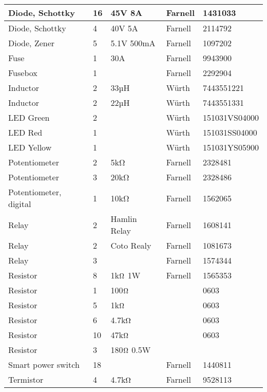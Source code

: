 \documentclass[10pt, titlepage]{article}
\begin{document}
\begin{center}
\begin{tabularx}{\textwidth}{|X|l|l|l|l|}
    Diode, Schottky & 16 & 45V 8A & Farnell & 1431033 \\ \hline
    Diode, Schottky & 4 & 40V 5A & Farnell & 2114792 \\ \hline
    Diode, Zener & 5 & 5.1V 500mA & Farnell & 1097202 \\ \hline
    Fuse & 1 & 30A & Farnell & 9943900\\ \hline
    Fusebox & 1 & & Farnell & 2292904 \\ \hline
    Inductor & 2 & 33µH & Würth & 7443551221 \\ \hline
    Inductor & 2 & 22µH & Würth & 7443551331 \\ \hline
    LED Green & 2 & & Würth & 151031VS04000 \\ \hline
    LED Red & 1 & & Würth & 151031SS04000 \\ \hline
    LED Yellow & 1 & & Würth & 151031YS05900 \\ \hline
    Potentiometer & 2 & 5kΩ  & Farnell & 2328481 \\ \hline
    Potentiometer & 3 & 20kΩ & Farnell & 2328486 \\ \hline
    Potentiometer, digital & 1 & 10kΩ & Farnell & 1562065 \\ \hline
    Relay & 2 & Hamlin Relay & Farnell & 1608141\\ \hline
    Relay & 2 & Coto Realy & Farnell & 1081673 \\ \hline
    Relay & 3 & & Farnell & 1574344 \\ \hline
    Resistor & 8 & 1k$\ohm$ 1W & Farnell & 1565353 \\ \hline
    Resistor & 1 & 100$\ohm$ & & 0603  \\ \hline
    Resistor & 5 & 1k$\ohm$ & & 0603  \\ \hline
    Resistor & 6 & 4.7k$\ohm$ & & 0603  \\ \hline
    Resistor & 10 & 47k$\ohm$ & & 0603  \\ \hline
    Resistor & 3 & 180$\ohm$ 0.5W & & \\ \hline
    Smart power switch & 18	 & & Farnell & 1440811 \\ \hline
    Termistor & 4 & 4.7k$\ohm$ & Farnell & 9528113 \\ \hline
	\end{tabularx}
\end{center}
\end{document}
